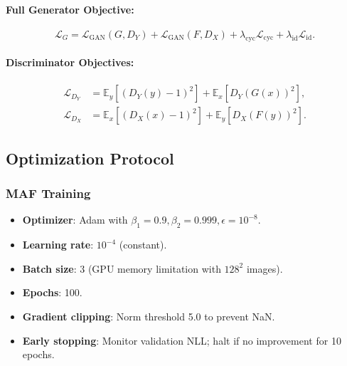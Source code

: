 \documentclass[conference]{IEEEtran}
\begin{document}
\paragraph{Full Generator Objective:}
\begin{equation}
\mathcal{L}_G = \mathcal{L}_{\text{GAN}}(G, D_Y) + \mathcal{L}_{\text{GAN}}(F, D_X) + \lambda_{\text{cyc}} \mathcal{L}_{\text{cyc}} + \lambda_{\text{id}} \mathcal{L}_{\text{id}}.
\end{equation}

\paragraph{Discriminator Objectives:}
\begin{align}
\mathcal{L}_{D_Y} &= \mathbb{E}_{y}[(D_Y(y) - 1)^2] + \mathbb{E}_{x}[D_Y(G(x))^2], \\
\mathcal{L}_{D_X} &= \mathbb{E}_{x}[(D_X(x) - 1)^2] + \mathbb{E}_{y}[D_X(F(y))^2].
\end{align}

\subsection{Optimization Protocol}
\subsubsection{MAF Training}
\begin{itemize}
\item \textbf{Optimizer}: Adam with $\beta_1=0.9, \beta_2=0.999, \epsilon=10^{-8}$.
\item \textbf{Learning rate}: $10^{-4}$ (constant).
\item \textbf{Batch size}: 3 (GPU memory limitation with $128^2$ images).
\item \textbf{Epochs}: 100.
\item \textbf{Gradient clipping}: Norm threshold 5.0 to prevent NaN.
\item \textbf{Early stopping}: Monitor validation NLL; halt if no improvement for 10 epochs.
\end{itemize}
\end{document}
